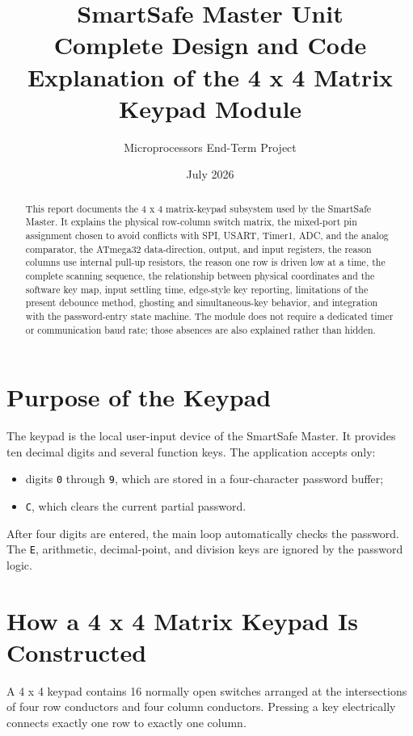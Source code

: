 \documentclass[11pt,a4paper]{article}
\title{\textbf{SmartSafe Master Unit}\\[4pt]
\Large Complete Design and Code Explanation of the 4 x 4 Matrix Keypad Module}
\author{Microprocessors End-Term Project}
\date{July 2026}
\begin{document}
\maketitle
\thispagestyle{empty}

\begin{abstract}
This report documents the 4 x 4 matrix-keypad subsystem used by the SmartSafe Master. It explains the physical row-column switch matrix, the mixed-port pin assignment chosen to avoid conflicts with SPI, USART, Timer1, ADC, and the analog comparator, the ATmega32 data-direction, output, and input registers, the reason columns use internal pull-up resistors, the reason one row is driven low at a time, the complete scanning sequence, the relationship between physical coordinates and the software key map, input settling time, edge-style key reporting, limitations of the present debounce method, ghosting and simultaneous-key behavior, and integration with the password-entry state machine. The module does not require a dedicated timer or communication baud rate; those absences are also explained rather than hidden.
\end{abstract}

\tableofcontents
\newpage

\section{Purpose of the Keypad}
The keypad is the local user-input device of the SmartSafe Master. It provides ten decimal digits and several function keys. The application accepts only:
\begin{itemize}
  \item digits \texttt{0} through \texttt{9}, which are stored in a four-character password buffer;
  \item \texttt{C}, which clears the current partial password.
\end{itemize}
After four digits are entered, the main loop automatically checks the password. The \texttt{E}, arithmetic, decimal-point, and division keys are ignored by the password logic.

\section{How a 4 x 4 Matrix Keypad Is Constructed}
A 4 x 4 keypad contains 16 normally open switches arranged at the intersections of four row conductors and four column conductors. Pressing a key electrically connects exactly one row to exactly one column.
\end{document}
